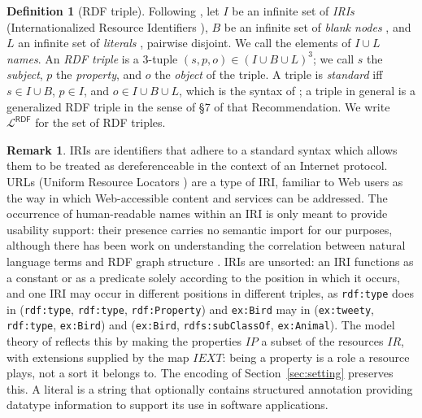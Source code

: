 \documentclass[12pt]{article}
\theoremstyle{definition}
\newtheorem{definition}{Definition}
\newtheorem{remark}{Remark}
\newcommand{\Lrdf}{\mathcal{L}^{\mathsf{RDF}}}  %
\begin{document}
\begin{definition}[RDF triple]
\label{def:rdftriple}
Following \citet{angles2020mapping}, let \( I \) be an infinite set of \textit{IRIs} (Internationalized Resource Identifiers \citealp{durst2005internationalized}), \( B \) be an infinite set of \textit{blank nodes} \citep{hogan2014everything}, and \( L \) an infinite set of \textit{literals} \citep{beek2018literally}, pairwise disjoint. We call the elements of $I \cup L$ \textit{names}. An \textit{RDF triple} is a 3-tuple $(s, p, o) \in (I \cup B \cup L)^{3}$; we call $s$ the \textit{subject}, $p$ the \textit{property}, and $o$ the \textit{object} of the triple. A triple is \textit{standard} iff $s \in I \cup B$, $p \in I$, and $o \in I \cup B \cup L$, which is the syntax of \citet{cyganiak2014rdf}; a triple in general is a generalized RDF triple in the sense of \S 7 of that Recommendation. We write $\Lrdf$ for the set of RDF triples.
\end{definition}

\begin{remark}
\label{rem:subsentential}
IRIs are identifiers that adhere to a standard syntax which allows them to be treated as dereferenceable in the context of an Internet protocol. URLs (Uniform Resource Locators \citep{bernerslee2005uri}) are a type of IRI, familiar to Web users as the way in which Web-accessible content and services can be addressed. The occurrence of human-readable names within an IRI is only meant to provide usability support: their presence carries no semantic import for our purposes, although there has been work on understanding the correlation between natural language terms and RDF graph structure \citep{derooij2016names}. IRIs are unsorted: an IRI functions as a constant or as a predicate solely according to the position in which it occurs, and one IRI may occur in different positions in different triples, as \texttt{rdf:type} does in (\texttt{rdf:type}, \texttt{rdf:type}, \texttt{rdf:Property}) and \texttt{ex:Bird} may in (\texttt{ex:tweety}, \texttt{rdf:type}, \texttt{ex:Bird}) and (\texttt{ex:Bird}, \texttt{rdfs:subClassOf}, \texttt{ex:Animal}). The model theory of \citet{hayes2014rdf} reflects this by making the properties $IP$ a subset of the resources $IR$, with extensions supplied by the map $IEXT$: being a property is a role a resource plays, not a sort it belongs to. The encoding of Section~\ref{sec:setting} preserves this. A literal is a string that optionally contains structured annotation providing datatype information \citep{peterson2012xsd} to support its use in software applications. 
\end{remark}
\end{document}
